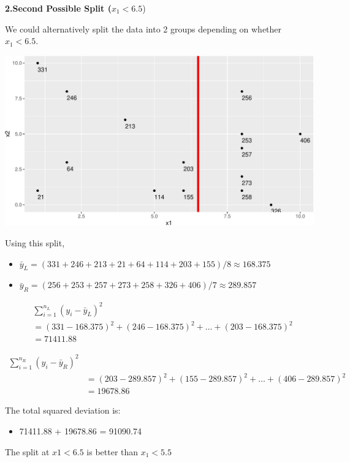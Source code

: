 \documentclass[
  letterpaper,
  DIV=11,
  numbers=noendperiod]{scrreprt}
\providecommand{\tightlist}{%
  \setlength{\itemsep}{0pt}\setlength{\parskip}{0pt}}\usepackage{longtable,booktabs,array}
\begin{document}
\textbf{2.Second Possible Split (}\(x_1 < 6.5\))

We could alternatively split the data into 2 groups depending on whether
\(x_1 < 6.5\).

\includegraphics{Ch7_files/figure-pdf/unnamed-chunk-53-1.pdf}

Using this split,

\begin{itemize}
\tightlist
\item
  \(\bar{y}_L = (331+246+213+21+64+114 + 203+155)/8 \approx 168.375\)\\
\item
  \(\bar{y}_R = (256+253+257+273+258+326+406)/7 \approx 289.857\)
\end{itemize}

\[
\begin{aligned}
& \displaystyle\sum_{i=1}^{n_L} (y_i -\bar{y}_L)^2  \\
& =(331-168.375)^2+(246-168.375)^2 + \ldots+(203-168.375)^2 \\
& =71411.88
\end{aligned}
\]

\[
\begin{aligned}
\displaystyle\sum_{i=1}^{n_R} (y_i -\bar{y}_R)^2 \\
& =(203-289.857)^2+(155-289.857)^2 + \ldots+(406-289.857)^2 \\
& =19678.86
\end{aligned}
\]

The total squared deviation is:

\begin{itemize}
\tightlist
\item
  71411.88 + 19678.86 = 91090.74
\end{itemize}

The split at \(x1 < 6.5\) is better than \(x_1<5.5\)
\end{document}
